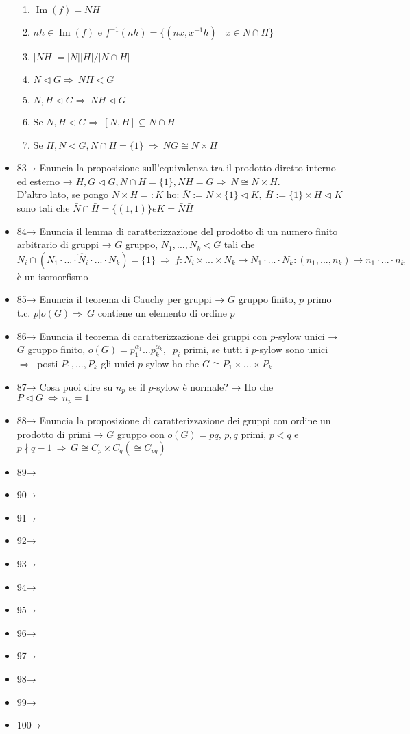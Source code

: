 \documentclass[A4,12pt]{article}
\newcommand{\then}{\Rightarrow}
\renewcommand{\iff}{\Leftrightarrow}
\newcommand{\psy}{$ p $-sylow }
\begin{document}
\begin{itemize}[noitemsep]
\begin{enumerate}[noitemsep]
			\item $\operatorname{Im}(f) = NH  $
			\item $ nh\in \operatorname{Im}(f) $ e $ f^{-1}(nh)=\{(nx,x^{-1}h)\mid x\in N\cap H \} $
			\item $ |NH| = |N||H|/|N\cap H| $
			\item $ N\lhd G\then\ NH<G $
			\item $ N,H\lhd G\then\ NH\lhd G $
			\item Se $ N,H\lhd G\then\ [N,H]\subseteq N\cap H $
			\item Se $ H,N\lhd G, N\cap H = \{1\}\ \then\ NG\cong N\times H $
		\end{enumerate}
		\item 83→ Enuncia la proposizione sull'equivalenza tra il prodotto diretto interno ed esterno → $ H,G\lhd G, N\cap H = \{1\}, NH = G\then\ N\cong N\times H $.\\ D'altro lato, se pongo $ N\times H=: K  $ ho: $ \bar N := N\times \{1\} \lhd K,\ \bar H :=\{1\}\times H\lhd K $ sono tali che $ \bar N \cap \bar H = \{(1,1)\} e K=\bar N \bar H $
		\item 84→ Enuncia il lemma di caratterizzazione del prodotto di un numero finito arbitrario di gruppi → $ G $ gruppo, $ N_1,...,N_k\lhd G $ tali che $ N_i \cap (N_1\cdot ... \cdot \hat N_i \cdot ... \cdot N_k)  = \{1\}\ \then\ f:N_i\times ...\times N_k \to N_1 \cdot ... \cdot N_k : (n_1, ..., n_k)\to n_1\cdot ...\cdot n_k  $ è un isomorfismo
		\item 85→ Enuncia il teorema di Cauchy per gruppi → $ G $ gruppo finito, $  p $ primo t.c. $ p| o(G)\then\ G $ contiene un elemento di ordine $ p $ 
		\item 86→ Enuncia il teorema di caratterizzazione dei gruppi con \psy unici → $ G  $ gruppo finito, $ o(G)= p_1^{\alpha_1}...p_k^{\alpha_k},$  $\ p_i $ primi, se tutti i \psy sono unici $ \then\ $ posti $ P_1,...,P_k $ gli unici \psy ho che $ G \cong P_1\times...\times P_k $
		\item 87→ Cosa puoi dire su $ n_p  $ se il \psy è normale? → Ho che $ P\lhd G\ \iff\ n_p = 1$
		\item 88→ Enuncia la proposizione di caratterizzazione dei gruppi con ordine un prodotto di primi → $ G $ gruppo con $ o(G) = pq $, $p,q$ primi, $ p<q$ e $ p\nmid q-1\ \then\  G\cong C_p\times C_q (\cong C_{pq})$
		\item 89→ 
		\item 90→ 
		\item 91→ 
		\item 92→ 
		\item 93→ 
		\item 94→ 
		\item 95→ 
		\item 96→ 
		\item 97→ 
		\item 98→ 
		\item 99→ 
		\item 100→ 
		
	\end{itemize}
	
		
	
\end{document}
